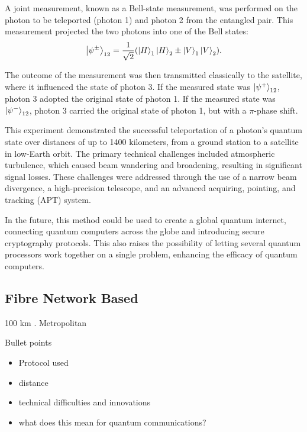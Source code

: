 A joint measurement, known as a Bell-state measurement, was performed on the photon to be teleported (photon 1) and photon 2 from the entangled pair. 
This measurement projected the two photons into one of the Bell states:
\begin{equation}
    \ket{\psi^{\pm}}_{12} = \frac{1}{\sqrt{2}} (\ket{H}_1\ket{H}_2 \pm \ket{V}_1\ket{V}_2).
\end{equation}

The outcome of the measurement was then transmitted classically to the satellite, where it influenced the state of photon 3. If the measured state was \(\ket{\psi^{+}}_{12}\), photon 3 adopted the original state of photon 1. If the measured state was \(\ket{\psi^{-}}_{12}\), photon 3 carried the original state of photon 1, but with a \(\pi\)-phase shift.  

This experiment demonstrated the successful teleportation of a photon's quantum state over distances of up to 1400 kilometers, from a ground station to a satellite in low-Earth orbit. The primary technical challenges included atmospheric turbulence, which caused beam wandering and broadening, resulting in significant signal losses. These challenges were addressed through the use of a narrow beam divergence, a high-precision telescope, and an advanced acquiring, pointing, and tracking (APT) system.

In the future, this method could be used to create a global quantum internet, connecting quantum computers across the globe and introducing secure cryptography protocols. 
This also raises the possibility of letting several quantum processors work together on a single problem, enhancing the efficacy of quantum computers.

\subsection{Fibre Network Based}
100 km \cite{Takesue:2015}. Metropolitan \cite{Valivarthi:2016}
\begin{mybox}{Bullet points}
    \begin{itemize}
        \item Protocol used
        \item distance
        \item technical difficulties and innovations
        \item what does this mean for quantum communications?
    \end{itemize}
\end{mybox} 
